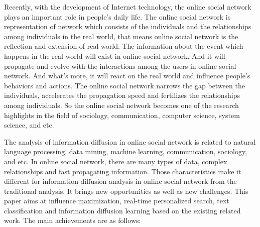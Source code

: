 \begin{eabstract}
Recently, with the development of Internet technology, the online social network plays an important role in people's daily life. The online social network is representation of network which consists of the individuals and the relationships among individuals in the real world, that means online social network is the reflection and extension of real world. The information about the event which happens in the real world will exist in online social network. And it will propagate and evolve with the interactions among the users in online social network. And what's more, it will react on the real world and influence people's behaviors and actions. The online social network narrows the gap between the individuals, accelerates the propagation speed and fertilizes the relationships among individuals. So the online social network becomes one of the research highlights in the field of sociology, communication, computer science, system science, and etc.

The analysis of information diffusion in online social network is related to natural language processing, data mining, machine learning, communication, sociology, and etc. In online social network, there are many types of data, complex relationships and fast propagating information. Those characteristics make it different for information diffusion analysis in online social network from the traditional analysis. It brings new opportunities as well as new challenges. This paper aims at influence maximization, real-time personalized search, text classification and information diffusion learning based on the existing related work. The main achievements are as follows:


\end{eabstract}
